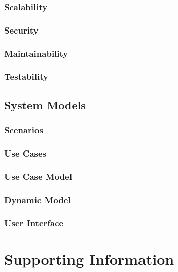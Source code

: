 \documentclass[11pt]{article}
\begin{document}
        \subsubsection{Scalability}
        \subsubsection{Security}
        \subsubsection{Maintainability}
        \subsubsection{Testability}
    
    \subsection{System Models}

        \subsubsection{Scenarios}
        \subsubsection{Use Cases}
        \subsubsection{Use Case Model}
        \subsubsection{Dynamic Model}
        \subsubsection{User Interface}


\section{Supporting Information}
\end{document}
